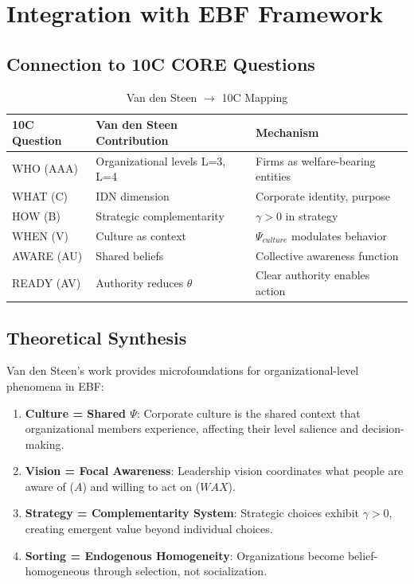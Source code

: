 \section{Integration with EBF Framework}

\subsection{Connection to 10C CORE Questions}

\begin{table}[htbp]
\centering
\caption{Van den Steen $\rightarrow$ 10C Mapping}
\label{tab:vandensteen-9c}
\renewcommand{\arraystretch}{1.3}
\begin{tabular}{@{}lll@{}}
\toprule
\textbf{10C Question} & \textbf{Van den Steen Contribution} & \textbf{Mechanism} \\
\midrule
WHO (AAA) & Organizational levels L=3, L=4 & Firms as welfare-bearing entities \\
WHAT (C) & IDN dimension & Corporate identity, purpose \\
HOW (B) & Strategic complementarity & $\gamma > 0$ in strategy \\
WHEN (V) & Culture as context & $\Psi_{culture}$ modulates behavior \\
AWARE (AU) & Shared beliefs & Collective awareness function \\
READY (AV) & Authority reduces $\theta$ & Clear authority enables action \\
\bottomrule
\end{tabular}
\end{table}

\subsection{Theoretical Synthesis}

Van den Steen's work provides microfoundations for organizational-level phenomena
in EBF:

\begin{enumerate}
    \item \textbf{Culture = Shared $\Psi$}: Corporate culture is the shared
    context that organizational members experience, affecting their level
    salience and decision-making.

    \item \textbf{Vision = Focal Awareness}: Leadership vision coordinates
    what people are aware of ($A$) and willing to act on ($WAX$).

    \item \textbf{Strategy = Complementarity System}: Strategic choices exhibit
    $\gamma > 0$, creating emergent value beyond individual choices.

    \item \textbf{Sorting = Endogenous Homogeneity}: Organizations become
    belief-homogeneous through selection, not socialization.
\end{enumerate}

